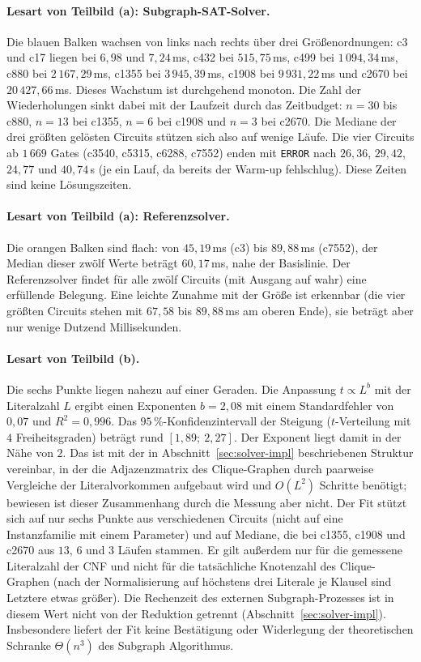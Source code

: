 \documentclass[a4paper,12pt]{article}
\theoremstyle{definition}
\begin{document}
\paragraph{Lesart von Teilbild (a): Subgraph-SAT-Solver.} Die blauen Balken wachsen von links nach rechts über drei Größenordnungen: c3 und c17 liegen bei $6{,}98$ und $7{,}24$\,ms, c432 bei $515{,}75$\,ms, c499 bei $1\,094{,}34$\,ms, c880 bei $2\,167{,}29$\,ms, c1355 bei $3\,945{,}39$\,ms, c1908 bei $9\,931{,}22$\,ms und c2670 bei $20\,427{,}66$\,ms. Dieses Wachstum ist durchgehend monoton. Die Zahl der Wiederholungen sinkt dabei mit der Laufzeit durch das Zeitbudget: $n=30$ bis c880, $n=13$ bei c1355, $n=6$ bei c1908 und $n=3$ bei c2670. Die Mediane der drei größten gelösten Circuits stützen sich also auf wenige Läufe. Die vier Circuits ab $1\,669$ Gates (c3540, c5315, c6288, c7552) enden mit \texttt{ERROR} nach $26{,}36$, $29{,}42$, $24{,}77$ und $40{,}74$\,s (je ein Lauf, da bereits der Warm-up fehlschlug). Diese Zeiten sind keine Lösungszeiten.

\paragraph{Lesart von Teilbild (a): Referenzsolver.} Die orangen Balken sind flach: von $45{,}19$\,ms (c3) bis $89{,}88$\,ms (c7552), der Median dieser zwölf Werte beträgt $60{,}17$\,ms, nahe der Basislinie. Der Referenzsolver findet für alle zwölf Circuits (mit Ausgang auf wahr) eine erfüllende Belegung. Eine leichte Zunahme mit der Größe ist erkennbar (die vier größten Circuits stehen mit $67{,}58$ bis $89{,}88$\,ms am oberen Ende), sie beträgt aber nur wenige Dutzend Millisekunden.

\paragraph{Lesart von Teilbild (b).} Die sechs Punkte liegen nahezu auf einer Geraden. Die Anpassung $t \propto L^{b}$ mit der Literalzahl $L$ ergibt einen Exponenten $b = 2{,}08$ mit einem Standardfehler von $0{,}07$ und $R^2 = 0{,}996$. Das $95$\,\%-Konfidenzintervall der Steigung ($t$-Verteilung mit $4$ Freiheitsgraden) beträgt rund $[1{,}89;\ 2{,}27]$. Der Exponent liegt damit in der Nähe von $2$. Das ist mit der in Abschnitt~\ref{sec:solver-impl} beschriebenen Struktur vereinbar, in der die Adjazenzmatrix des Clique-Graphen durch paarweise Vergleiche der Literalvorkommen aufgebaut wird und $O(L^2)$ Schritte benötigt; bewiesen ist dieser Zusammenhang durch die Messung aber nicht. Der Fit stützt sich auf nur sechs Punkte aus verschiedenen Circuits (nicht auf eine Instanzfamilie mit einem Parameter) und auf Mediane, die bei c1355, c1908 und c2670 aus $13$, $6$ und $3$ Läufen stammen. Er gilt außerdem nur für die gemessene Literalzahl der CNF und nicht für die tatsächliche Knotenzahl des Clique-Graphen (nach der Normalisierung auf höchstens drei Literale je Klausel sind Letztere etwas größer). Die Rechenzeit des externen Subgraph-Prozesses ist in diesem Wert nicht von der Reduktion getrennt (Abschnitt~\ref{sec:solver-impl}). Insbesondere liefert der Fit keine Bestätigung oder Widerlegung der theoretischen Schranke $\Theta(n^3)$ des Subgraph Algorithmus.
\end{document}
